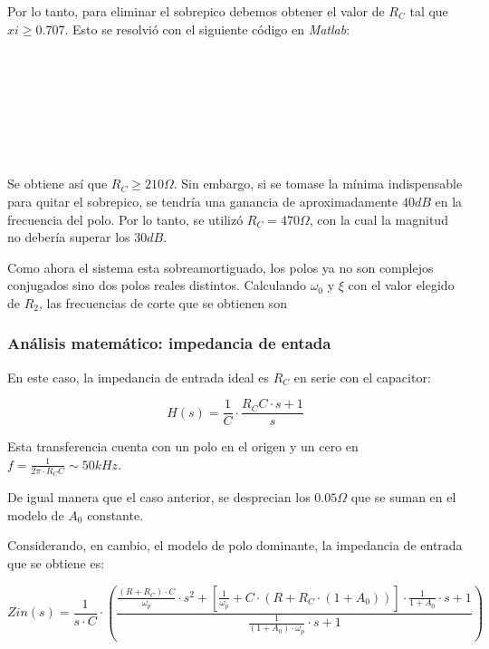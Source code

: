 \documentclass[../../main.tex]{subfiles}
\begin{document}
Por lo tanto, para eliminar el sobrepico debemos obtener el valor de $R_C$ tal que $xi\geq 0.707$. Esto se resolvi\'o con el siguiente c\'odigo en \textit{Matlab}:\\
\newline
{}\\
\\
\\
\\
\\
\\
\\

Se obtiene as\'i que $R_C \geq 210\Omega$. Sin embargo, si se tomase la m\'inima indispensable para quitar el sobrepico, se tendr\'ia una ganancia de aproximadamente $40dB$ en la frecuencia del polo. Por lo tanto, se utiliz\'o $R_C = 470\Omega$, con la cual la magnitud no deber\'ia superar los $30dB$. \par

Como ahora el sistema esta sobreamortiguado, los polos ya no son complejos conjugados sino dos polos reales distintos. Calculando $\omega_0$ y $\xi$ con el valor elegido de $R_2$, las frecuencias de corte que se obtienen son 

\subsubsection{An\'alisis matem\'atico: impedancia de entada}
En este caso, la impedancia de entrada ideal es $R_C$ en serie con el capacitor:

\[ H(s) = \frac{1}{C} \cdot \frac{R_C C \cdot s + 1}{s} \]
 
 Esta transferencia cuenta con un polo en el origen y un cero en $f = \frac{1}{2\pi \cdot R_C C} \sim 50kHz$.\par

De igual manera que el caso anterior, se desprecian los $0.05\Omega$ que se suman en el modelo de $A_0$ constante.\par

Considerando, en cambio, el modelo de polo dominante, la impedancia de entrada que se obtiene es:

\begin{equation}Z{in}(s) = \frac{1} {s \cdot C} \cdot \left(\frac{ \frac{(R+R_C)\cdot C}{\omega_p}\cdot s^2 +  [\frac{1}{\omega_p}+ C\cdot(R+R_C\cdot(1+A_0))]\cdot \frac{1}{1+A_0}\cdot s + 1 }{ \frac{1}{(1+A_0)\cdot \omega_p}\cdot s + 1 }\right)\end{equation}
\end{document}

